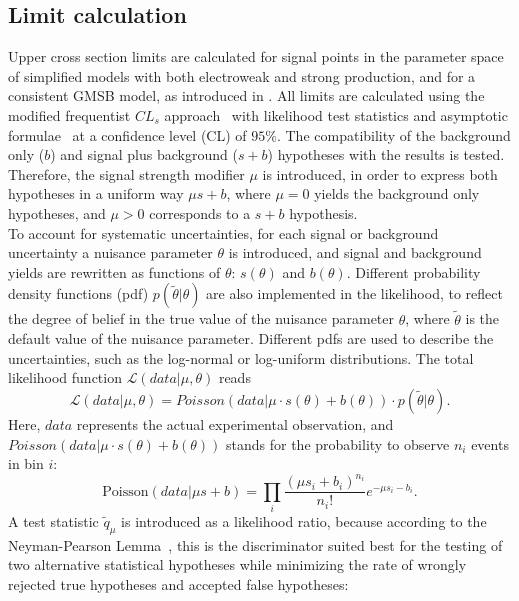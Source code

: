 \subsection{Limit calculation}
Upper cross section limits are calculated for signal points in the parameter space of simplified models with both electroweak and strong production, and for a consistent GMSB model, as introduced in . All limits are calculated using the modified frequentist $CL_s$ approach~\cite{CLS1,CLS2,CLS3} with likelihood test statistics and asymptotic formulae~\cite{AsymptoticFormulae,AsymptoticFormulae2} at a confidence level (CL) of $95\%$. The compatibility of the background only ($b$) and signal plus background ($s+b$) hypotheses with the results is tested. Therefore, the signal strength modifier $\mu$ is introduced, in order to express both hypotheses in a uniform way $\mu s+b$, where $\mu=0$ yields the background only hypotheses, and $\mu>0$ corresponds to a $s+b$ hypothesis.\\
To account for systematic uncertainties, for each signal or background uncertainty a nuisance parameter $\theta$ is introduced, and signal and background yields are rewritten as functions of $\theta$: $s(\theta)$ and $b(\theta)$. Different probability density functions (pdf) $p(\tilde{\theta}|\theta)$ are also implemented in the likelihood, to reflect the degree of belief in the true value of the nuisance parameter $\theta$, where $\tilde{\theta}$ is the default value of the nuisance parameter. Different pdfs are used to describe the uncertainties, such as the log-normal or log-uniform distributions. The total likelihood function $\mathcal{L}(data|\mu,\theta)$ reads
\begin{equation}
 \mathcal{L}(data|\mu,\theta)= Poisson(data|\mu\cdot s(\theta)+b(\theta))\cdot p(\tilde{\theta}|\theta).
\end{equation}
Here, $data$ represents the actual experimental observation, and $Poisson(data|\mu\cdot s(\theta)+b(\theta))$ stands for the probability to observe $n_i$ events in bin $i$:
\begin{equation}
 \mathrm{Poisson}(data|\mu s+b)=\prod_i \frac{(\mu s_i+b_i)^{n_i}}{n_i!}e^{-\mu s_i - b_i}.
\end{equation}
A test statistic $\tilde{q}_\mu$ is introduced as a likelihood ratio, because according to the Neyman-Pearson Lemma~\cite{NeymanPearson}, this is the discriminator suited best for the testing of two alternative statistical hypotheses while minimizing the rate of wrongly rejected true hypotheses and accepted false hypotheses:
